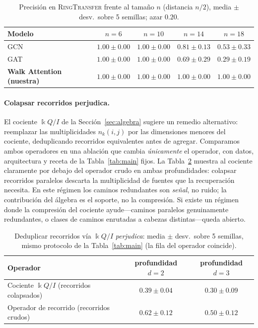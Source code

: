 \documentclass[runningheads]{llncs}
\newcommand{\kk}{\Bbbk}
\newcommand{\kQ}{\kk Q}
\begin{document}
\begin{table}[t]
\centering
\caption{Precisión en \textsc{RingTransfer} frente al tamaño $n$ (distancia
$n/2$), media $\pm$ desv.\ sobre 5 semillas; azar $0.20$.}
\label{tab:ring}
\begin{tabular}{lcccc}
\toprule
\textbf{Modelo} & $n{=}6$ & $n{=}10$ & $n{=}14$ & $n{=}18$ \\
\midrule
GCN                    & $1.00\pm0.00$ & $1.00\pm0.00$ & $0.81\pm0.13$ & $0.53\pm0.33$ \\
GAT                    & $1.00\pm0.00$ & $1.00\pm0.00$ & $0.69\pm0.29$ & $0.29\pm0.19$ \\
\textbf{Walk Attention (nuestra)} & $\mathbf{1.00\pm0.00}$ & $\mathbf{1.00\pm0.00}$ & $\mathbf{1.00\pm0.00}$ & $\mathbf{1.00\pm0.00}$ \\
\bottomrule
\end{tabular}
\end{table}

\paragraph{Colapsar recorridos perjudica.}
El cociente $\kQ/I$ de la Sección~\ref{sec:algebra} sugiere un remedio
alternativo: reemplazar las multiplicidades $n_k(i,j)$ por las dimensiones
menores del cociente, deduplicando recorridos equivalentes antes de agregar.
Comparamos ambos operadores en una ablación que cambia \emph{únicamente} el
operador, con datos, arquitectura y receta de la Tabla~\ref{tab:main} fijos. La
Tabla~\ref{tab:quotient} muestra al cociente claramente por debajo del operador
crudo en ambas profundidades: colapsar recorridos paralelos descarta la
multiplicidad de fuentes que la recuperación necesita. En este régimen los
caminos redundantes son \emph{señal}, no ruido; la contribución del álgebra es
el soporte, no la compresión. Si existe un régimen donde la compresión del
cociente ayude---caminos paralelos genuinamente redundantes, o clases de
caminos enrutadas a cabezas distintas---queda abierto.

\begin{table}[t]
\centering
\caption{Deduplicar recorridos vía $\kQ/I$ \emph{perjudica}: media $\pm$ desv.\
sobre 5 semillas, mismo protocolo de la Tabla~\ref{tab:main} (la fila del
operador coincide).}
\label{tab:quotient}
\begin{tabular}{lcc}
\toprule
\textbf{Operador} & \textbf{profundidad $d=2$} & \textbf{profundidad $d=3$} \\
\midrule
Cociente $\kQ/I$ (recorridos colapsados) & $0.39\pm0.04$ & $0.30\pm0.09$ \\
Operador de recorrido (recorridos crudos)          & $\mathbf{0.62\pm0.12}$ & $\mathbf{0.50\pm0.12}$ \\
\bottomrule
\end{tabular}
\end{table}
\end{document}
